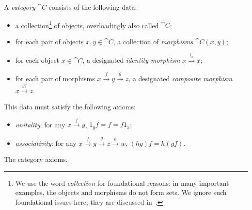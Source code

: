 \begin{dfn}[Category]\label{def:category}
	A \emph{category} $\cat{C}$ consists of the following data:
	\begin{itemize}
		\item a collection\footnote{We use the word \emph{collection} for foundational reasons: in
			      many important examples, the objects and morphisms do not form sets. We ignore
			      such foundational issues here; they are discussed in~\cite[Section
				      1.6]{maclane-1971}.} of objects, overloadingly also called $\cat{C}$;
		\item for each pair of objects $x,y \in  \cat{C}$, a collection of \emph{morphisms} $\cat{C}(x, y)$;
		\item for each object $x \in \cat{C}$, a designated \emph{identity morphism} $x \xrightarrow{1_x}  x$;
		\item for each pair of morphisms $x \xrightarrow{f}  y \xrightarrow{g}  z$, a designated \emph{composite morphism} $x \xrightarrow{gf}  z$.
	\end{itemize}
	This data must satisfy the following axioms:
	\begin{itemize}
		\item \emph{unitality}: for any $x \xrightarrow{f}  y$, $1_yf = f = f1_x$;
		\item \emph{associativity}: for any $x \xrightarrow{f} 		y \xrightarrow{g} z \xrightarrow{h} w$, $(hg)f = h(gf)$.
	\end{itemize}
	\begin{fig}[H]
		\centering
		\caption{The category axioms.}
		\label{fig:category axioms}
	\end{fig}
\end{dfn}

